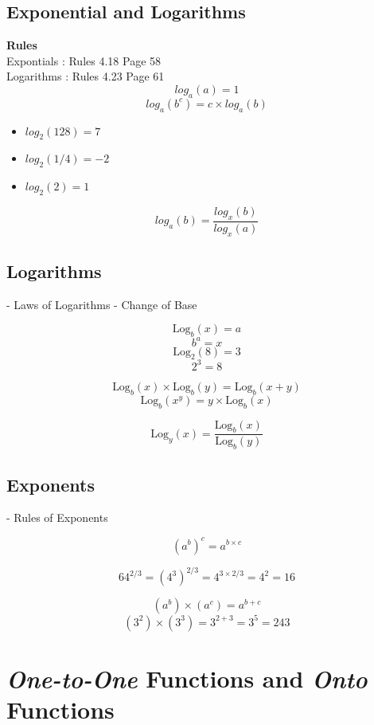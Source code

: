 \documentclass[12pt]{article}
\begin{document}
\subsection*{Exponential and Logarithms}

\textbf{Rules}\\
Expontials : Rules 4.18 Page 58 \\
Logarithms : Rules 4.23 Page 61 \\

\[ log_a(a) = 1 \]
\[ log_a(b^c) = c \times log_a(b) \]

\begin{itemize}
\item $log_2(128) = 7$
\item $log_2(1/4) = -2$
\item $log_2(2) = 1$
\end{itemize}

\[ log_a(b) = \frac{log_x(b)}{log_x(a)} \]

\subsection{Logarithms} 
 - Laws of Logarithms
 - Change of Base
  
 \[ \mbox{Log}_b(x) = a \] \[b^a = x \]
 \[ \mbox{Log}_2(8) = 3 \] \[2^3 = 8 \]

 \[ \mbox{Log}_b(x) \times \mbox{Log}_b(y) =  \mbox{Log}_b(x+y) \]
 \[ \mbox{Log}_b(x^y) =  y \times \mbox{Log}_b(x) \]

 \[ \mbox{Log}_y(x)  =  \frac{ \mbox{Log}_b(x) }{ \mbox{Log}_b(y) } \]
\subsection{Exponents}
 - Rules of Exponents

\[ (a^b)^c = a^{b \times c}\]

\[ 64^{2/3} =  (4^3)^{2/3} = 4^{3\times2/3} = 4^2 = 16 \]


\[ (a^b) \times (a^c) = a^{b+c}\]
\[ (3^2) \times (3^3) = 3^{2+3} = 3^5  =243 \]


\section{\textit{One-to-One} Functions and \textit{Onto} Functions}
\end{document}
